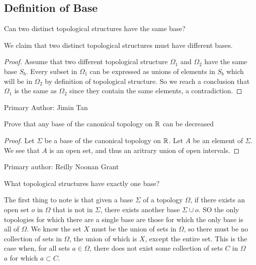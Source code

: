 \subsection{Definition of Base}
\begin{minorEx} %
Can two distinct topological structures have the same base?
\end{minorEx}

We claim that two distinct topological structures must have different bases.

\begin{proof}
Assume that two different topological structure $\Omega_1$ and $\Omega_2$ have the same base $S_b$. Every subset in $\Omega_1$ can be expressed as unions of elements in $S_b$ which will be in $\Omega_2$ by definition of topological structure. So we reach a conclusion that $\Omega_1$ is the same as $\Omega_2$ since they contain the same elements, a contradiction.
\end{proof}

Primary Author: Jimin Tan

\begin{minorEx}[Riddle]%
  Prove that any base of the canonical topology on $\mathbb{R}$ can be decreased
\end{minorEx}
\begin{proof}
  Let $\Sigma$ be a base of the canonical topology on $\mathbb{R}$. Let $A$ be an element of 
  $\Sigma$. We see that $A$ is an open set, and thus an aritrary union of open intervals. 
\end{proof}

Primary author: Reilly Noonan Grant

\begin{minorEx}[Riddle]%
What topological structures have exactly one base?
\end{minorEx}
The first thing to note is that given a base $\Sigma$ of a topology $\Omega$, if there exists an open set $o$ in $\Omega$ that is not in $\Sigma$, there exists another base $\Sigma \cup o$. SO the only topologies for which there are a single base are those for which the only base is all of $\Omega$. We know the set $X$ must be the union of sets in $\Omega$, so there must be no collection of sets in $\Omega$, the union of which is $X$, except the entire set. This is the case when, for all sets $a \in \Omega$, there does not exist some collection of sets $C$ in $\Omega$ \ $a$ for which $a \subset C$.
